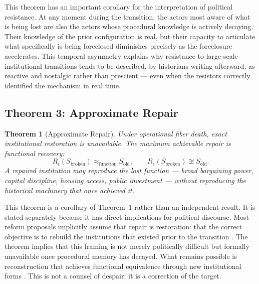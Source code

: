 \documentclass[12pt, a4paper]{article}
\theoremstyle{named}
\newtheorem{theorem}{Theorem}
\begin{document}
This theorem has an important corollary for the interpretation of
political resistance. At any moment during the transition, the actors
most aware of what is being lost are also the actors whose procedural
knowledge is actively decaying. Their knowledge of the prior
configuration is real, but their capacity to articulate what
specifically is being foreclosed diminishes precisely as the foreclosure
accelerates. This temporal asymmetry explains why resistance to
large-scale institutional transitions tends to be described, by
historians writing afterward, as reactive and nostalgic rather than
prescient — even when the resistors correctly identified the mechanism
in real time.

\subsection{Theorem 3: Approximate Repair}

\begin{theorem}[Approximate Repair]
Under operational fiber death, exact institutional restoration is
unavailable. The maximum achievable repair is functional recovery:
\[
  R_{\epsilon}(S_{\text{broken}})
  \approx_{\mathrm{function}} S_{\text{old}},
  \qquad
  R_{\epsilon}(S_{\text{broken}})
  \not\cong S_{\text{old}}.
\]
A repaired institution may reproduce the lost function — broad
bargaining power, capital discipline, housing access, public investment
— without reproducing the historical machinery that once achieved it.
\end{theorem}

This theorem is a corollary of Theorem~1 rather than an independent
result. It is stated separately because it has direct implications for
political discourse. Most reform proposals implicitly assume that repair
is restoration: that the correct objective is to rebuild the institutions
that existed prior to the transition \cite{streeck2016,mirowski2013}.
The theorem implies that this framing is not merely politically difficult
but formally unavailable once procedural memory has decayed. What
remains possible is reconstruction that achieves functional equivalence
through new institutional forms \cite{ostrom1990,williamson1985}. This
is not a counsel of despair; it is a correction of the target.
\end{document}
